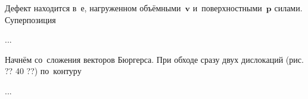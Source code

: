

\label{para:forceonpointdefect}

\begin{otherlanguage}{russian}

Дефект находится в~\rucontinuum{}е, нагруженном объёмными~$\bm{v}$ и~поверхностными~$\bm{p}$ силами.
Суперпозиция

...


\end{otherlanguage}



\label{para:dislocations.continuouslydistributed}

\begin{otherlanguage}{russian}

Начнём со~сложения векторов Бюргерса.
При обходе сразу двух дислокаций (рис. ?? 40 ??) по~контуру

...


\end{otherlanguage}



\label{para:coilwindingstress}

